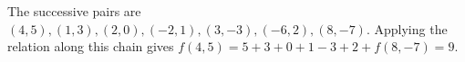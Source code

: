 The successive pairs are $(4,5),(1,3),(2,0),(-2,1),(3,-3),(-6,2),(8,-7)$. Applying the relation along this chain gives $f(4,5)=5+3+0+1-3+2+f(8,-7)=\boxed9$.
